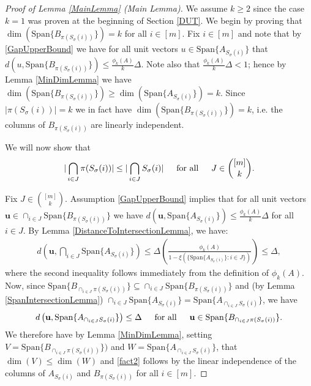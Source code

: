 \documentclass[journal, onecolumn]{IEEEtran}
\begin{document}
\begin{proof}[Proof of Lemma \ref{MainLemma} (Main Lemma)]
We assume $k \geq 2$ since the case $k = 1$ was proven at the beginning of Section \ref{DUT}. We begin by proving that $\dim(\text{Span}\{B_{\pi(S_\sigma(i))}\}) = k$ for all $i \in [m]$. Fix $i \in [m]$ and note that by \eqref{GapUpperBound} we have for all unit vectors $u \in \text{Span}\{A_{S_\sigma(i)}\}$ that $d(u, \text{Span}\{B_{\pi(S_\sigma(i))}\}) \leq \frac{\phi_k(A)}{k} \Delta$. Note also that $\frac{\phi_k(A)}{k} \Delta < 1$; hence by Lemma \ref{MinDimLemma} we have $\dim(\text{Span}\{B_{\pi(S_\sigma(i))}\}) \geq \dim(\text{Span}\{A_{S_\sigma(i)}\}) = k$. Since $|\pi(S_\sigma(i))| = k$ we in fact have $\dim(\text{Span}\{B_{\pi(S_\sigma(i))}\}) = k$, i.e. the columns of $B_{\pi(S_\sigma(i))}$ are linearly independent. 

We will now show that
\begin{align}\label{fact2}
|\bigcap_{i \in J} \pi(S_\sigma(i))| \leq |\bigcap_{i \in J} S_\sigma(i) | \indent \text{for all} \indent J \in {[m] \choose k}.
\end{align}

Fix $J \in {[m] \choose k}$. Assumption \eqref{GapUpperBound} implies that for all unit vectors $\mathbf{u} \in \cap_{i \in J} \text{Span}\{B_{\pi(S_\sigma(i))}\}$ we have $d(\mathbf{u}, \text{Span}\{A_{S_\sigma(i)}\}) \leq \frac{\phi_k(A)}{k} \Delta$ for all $i \in J$. By Lemma \ref{DistanceToIntersectionLemma}, we have:
\begin{align*}
d\left( \mathbf{u}, \bigcap_{i \in J} \text{Span}\{A_{S_{\sigma}(i)}\} \right) 
\leq \Delta \left( \frac{\phi_k(A)}{1 - \xi( \{ \text{Span}\{A_{S_{\sigma}(i)}\}: i \in J\} ) } \right) \leq \Delta,
\end{align*}
%
where the second inequality follows immediately from the definition of $\phi_k(A)$. Now, since $\text{Span}\{B_{\cap_{i \in J}\pi(S_\sigma(i))}\} \subseteq \cap_{i \in J} \text{Span}\{B_{\pi(S_\sigma(i))}\}$ and (by Lemma \ref{SpanIntersectionLemma}) $\cap_{i \in J}  \text{Span}\{A_{S_\sigma(i)}\} = \text{Span}\{A_{\cap_{i \in J}  S_\sigma(i)}\}$, we have
\begin{align}\label{fact1}
d\left( \mathbf{u}, \text{Span}\{A_{\cap_{i \in J} S_\sigma(i)}\} \right) \leq \Delta \indent \text{for all} \indent \mathbf{u} \in \text{Span}\{B_{\cap_{i \in J}\pi(S_\sigma(i))}\}.
\end{align}
We therefore have by Lemma \ref{MinDimLemma}, setting $V = \text{Span}\{B_{\cap_{i \in J}\pi(S_\sigma(i))}\})$ and $W = \text{Span}\{A_{\cap_{i \in J} S_\sigma(i)}\}$, that $\dim(V) \leq \dim(W)$ and \eqref{fact2} follows by the linear independence of the columns of $A_{S_\sigma(i)}$ and $B_{\pi(S_\sigma(i))}$ for all $i \in [m]$.


\end{proof}
\end{document}
